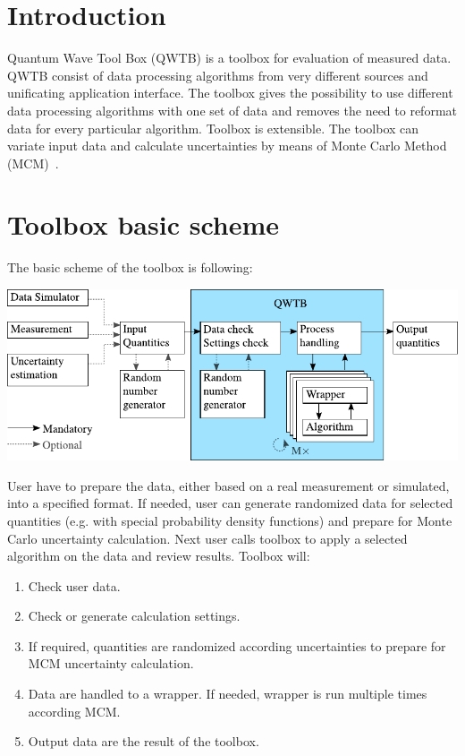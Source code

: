 \documentclass[12pt]{article} %
\begin{document}
\tableofcontents

\newpage

\section{Introduction} %
Quantum Wave Tool Box (QWTB) is a toolbox for evaluation of measured data. QWTB consist of data
processing algorithms from very different sources and unificating application interface. The toolbox
gives the possibility to use different data processing algorithms with one set of data and removes
the need to reformat data for every particular algorithm. Toolbox is extensible. The toolbox
can variate input data and calculate uncertainties by means of Monte Carlo Method
(MCM)~\cite{JCGM2008}.

\section{Toolbox basic scheme} %
The basic scheme of the toolbox is following:
\begin{center}
        \includegraphics{sources/basic scheme v2.pdf}
\end{center}

User have to prepare the data, either based on a real measurement or simulated, into a specified
format. If needed, user can generate randomized data for selected quantities (e.g. with special
probability density functions) and prepare for Monte Carlo uncertainty calculation. Next user calls
toolbox to apply a selected algorithm on the data and review results. Toolbox will:
\begin{enumerate}
        \item Check user data.
        \item Check or generate calculation settings.
        \item If required, quantities are randomized according uncertainties to prepare for MCM uncertainty calculation.
        \item Data are handled to a wrapper. If needed, wrapper is run multiple times according MCM.
        \item Output data are the result of the toolbox.
\end{enumerate}
\end{document}
